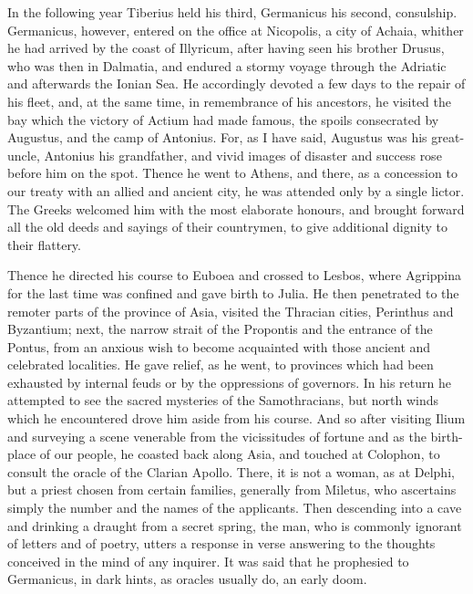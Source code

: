 
In the following year Tiberius held his third, Germanicus his second, consulship. Germanicus, however, entered on the office at Nicopolis, a city of Achaia, whither he had arrived by the coast of Illyricum, after having seen his brother Drusus, who was then in Dalmatia, and endured a stormy voyage through the Adriatic and afterwards the Ionian Sea. He accordingly devoted a few days to the repair of his fleet, and, at the same time, in remembrance of his ancestors, he visited the bay which the victory of Actium had made famous, the spoils consecrated by Augustus, and the camp of Antonius. For, as I have said, Augustus was his great-uncle, Antonius his grandfather, and vivid images of disaster and success rose before him on the spot. Thence he went to Athens, and there, as a concession to our treaty with an allied and ancient city, he was attended only by a single lictor. The Greeks welcomed him with the most elaborate honours, and brought forward all the old deeds and sayings of their countrymen, to give additional dignity to their flattery.


Thence he directed his course to Euboea and crossed to Lesbos, where Agrippina for the last time was confined and gave birth to Julia. He then penetrated to the remoter parts of the province of Asia, visited the Thracian cities, Perinthus and Byzantium; next, the narrow strait of the Propontis and the entrance of the Pontus, from an anxious wish to become acquainted with those ancient and celebrated localities. He gave relief, as he went, to provinces which had been exhausted by internal feuds or by the oppressions of governors. In his return he attempted to see the sacred mysteries of the Samothracians, but north winds which he encountered drove him aside from his course. And so after visiting Ilium and surveying a scene venerable from the vicissitudes of fortune and as the birth-place of our people, he coasted back along Asia, and touched at Colophon, to consult the oracle of the Clarian Apollo. There, it is not a woman, as at Delphi, but a priest chosen from certain families, generally from Miletus, who ascertains simply the number and the names of the applicants. Then descending into a cave and drinking a draught from a secret spring, the man, who is commonly ignorant of letters and of poetry, utters a response in verse answering to the thoughts conceived in the mind of any inquirer. It was said that he prophesied to Germanicus, in dark hints, as oracles usually do, an early doom.

